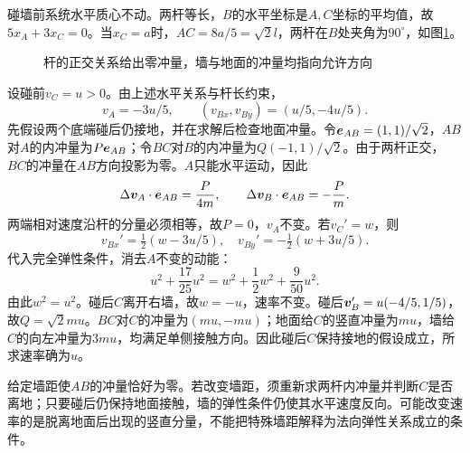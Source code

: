 \begin{solution}
碰墙前系统水平质心不动。两杆等长，$B$的水平坐标是$A,C$坐标的平均值，故$5x_A+3x_C=0$。当$x_C=a$时，$AC=8a/5=\sqrt2l$，两杆在$B$处夹角为$90^\circ$，如图\ref{fig:hw5-4-s}。

\begin{figure}[H]\centering
{}
\caption{杆的正交关系给出零冲量，墙与地面的冲量均指向允许方向}\label{fig:hw5-4-s}
\end{figure}

设碰前$v_C=u>0$。由上述水平关系与杆长约束，
\[
 v_A=-3u/5,\qquad (v_{Bx},v_{By})=(u/5,-4u/5).
\]
先假设两个底端碰后仍接地，并在求解后检查地面冲量。令$\bm{e}_{AB}=(1,1)/\sqrt2$，$AB$对$A$的内冲量为$P\bm{e}_{AB}$；令$BC$对$B$的内冲量为$Q(-1,1)/\sqrt2$。由于两杆正交，$BC$的冲量在$AB$方向投影为零。$A$只能水平运动，因此
\[
 \Delta\bm{v}_A\cdot\bm{e}_{AB}=\frac P{4m},\qquad
 \Delta\bm{v}_B\cdot\bm{e}_{AB}=-\frac Pm.
\]
两端相对速度沿杆的分量必须相等，故$P=0$，$v_A$不变。若$v_C'=w$，则
\[
 v_{Bx}'=\tfrac12(w-3u/5),\quad
 v_{By}'=-\tfrac12(w+3u/5).
\]
代入完全弹性条件，消去$A$不变的动能：
\[
 u^2+\frac{17}{25}u^2
 =w^2+\frac12w^2+\frac{9}{50}u^2.
\]
由此$w^2=u^2$。碰后$C$离开右墙，故$\boxed{w=-u}$，速率不变。碰后$\bm{v}_B'=u(-4/5,1/5)$，故$Q=\sqrt2mu$。$BC$对$C$的冲量为$(mu,-mu)$；地面给$C$的竖直冲量为$mu$，墙给$C$的向左冲量为$3mu$，均满足单侧接触方向。因此碰后$C$保持接地的假设成立，所求速率确为$u$。

给定墙距使$AB$的冲量恰好为零。若改变墙距，须重新求两杆内冲量并判断$C$是否离地；只要碰后仍保持地面接触，墙的弹性条件仍使其水平速度反向。可能改变速率的是脱离地面后出现的竖直分量，不能把特殊墙距解释为法向弹性关系成立的条件。


\end{solution}



